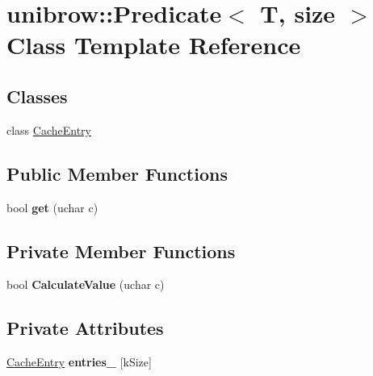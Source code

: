 \hypertarget{classunibrow_1_1_predicate}{}\section{unibrow\+:\+:Predicate$<$ T, size $>$ Class Template Reference}
\label{classunibrow_1_1_predicate}
\subsection*{Classes}
\begin{DoxyCompactItemize}
\item 
class \hyperlink{classunibrow_1_1_predicate_1_1_cache_entry}{Cache\+Entry}
\end{DoxyCompactItemize}
\subsection*{Public Member Functions}
\begin{DoxyCompactItemize}
\item 
bool {\bfseries get} (uchar c)\hypertarget{classunibrow_1_1_predicate_a64022f831257cbfd9ef81898a30ac6fe}{}\label{classunibrow_1_1_predicate_a64022f831257cbfd9ef81898a30ac6fe}

\end{DoxyCompactItemize}
\subsection*{Private Member Functions}
\begin{DoxyCompactItemize}
\item 
bool {\bfseries Calculate\+Value} (uchar c)\hypertarget{classunibrow_1_1_predicate_a8e97232ae2a978a9832e403a70faa94d}{}\label{classunibrow_1_1_predicate_a8e97232ae2a978a9832e403a70faa94d}

\end{DoxyCompactItemize}
\subsection*{Private Attributes}
\begin{DoxyCompactItemize}
\item 
\hyperlink{classunibrow_1_1_predicate_1_1_cache_entry}{Cache\+Entry} {\bfseries entries\+\_\+} \mbox{[}k\+Size\mbox{]}\hypertarget{classunibrow_1_1_predicate_aa5579ca70e8143e9f7f09d5b32a74a35}{}\label{classunibrow_1_1_predicate_aa5579ca70e8143e9f7f09d5b32a74a35}

\end{DoxyCompactItemize}

